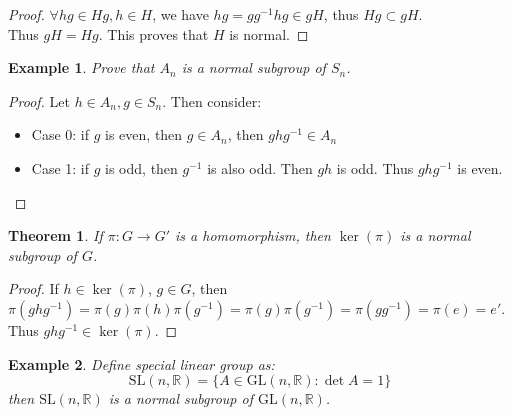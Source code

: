 \documentclass{article}
\theoremstyle{MyNonumberplain}
\theoremstyle{break}
\newtheorem*{proof}{Proof. }
\newcommand{\tmop}{\text}
\theoremstyle{break}
\newtheorem{theorem}{Theorem}[section]
\newtheorem{example}{Example}[section]
\theoremstyle{break}
\theoremstyle{definition}
\theoremstyle{break}
\begin{document}
\begin{thmbox}
\begin{prfbox}
\begin{proof}
              $\forall h g \in H g, h \in H$, we have $h g = g g^{- 1} h g \in g H$, thus $H
              g \subset g H$.\\
              
              Thus $g H = H g$. This proves that $H$ is normal.
        \end{proof}
    \end{prfbox}
\end{thmbox}

\begin{expbox}
    \begin{example}
        Prove that $A_n$ is a normal subgroup of $S_n$. 
    \end{example}
    \begin{prfbox}
        \begin{proof}
            Let $h \in A_n, g \in S_n$. Then consider:\\
            \begin{itemize}
            \item Case 0: if $g$ is even, then $g \in A_n$, then $g h g^{- 1} \in A_n$\\
            
            \item Case 1: if $g$ is odd, then $g^{- 1}$ is also odd. Then $g h$ is odd.
            Thus $g h g^{- 1}$ is even. 
            \end{itemize}
        \end{proof}
    \end{prfbox}
\end{expbox}

\begin{thmbox}
    \begin{theorem}
        If $\pi : G \rightarrow G'$ is a homomorphism, then $\ker (\pi)$ is a normal
        subgroup of $G$. 
    \end{theorem}
    \begin{prfbox}
        \begin{proof}
            If $h \in \ker (\pi)$, $g \in G$, then $\pi (g h g^{- 1}) = \pi (g) \pi (h)
            \pi (g^{- 1}) = \pi (g) \pi (g^{- 1}) = \pi (g g^{- 1}) = \pi (e) = e'$. Thus $g h g^{- 1} \in \ker (\pi)$.
        \end{proof}
    \end{prfbox}
\end{thmbox}

\begin{expbox}
    \begin{example}
        Define special linear group as:
        \[ \tmop{SL} (n, \mathbb{R}) = \{ A \in \tmop{GL} (n, \mathbb{R}) : \det A = 1
        \} \]
        then $\tmop{SL} (n, \mathbb{R})$ is a normal subgroup of $\tmop{GL} (n,
        \mathbb{R})$.
    \end{example}
\end{expbox}
\end{document}
